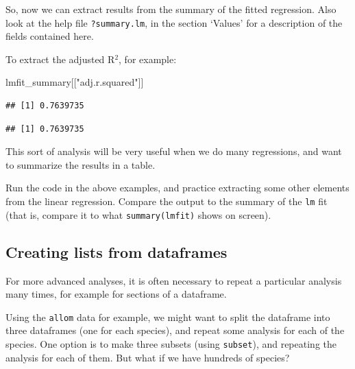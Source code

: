 \documentclass[]{book}
\newenvironment{Shaded}{\begin{snugshade}}{\end{snugshade}}
\newcommand{\CommentTok}[1]{\textcolor[rgb]{0.56,0.35,0.01}{\textit{#1}}}
\newcommand{\NormalTok}[1]{#1}
\newcommand{\OperatorTok}[1]{\textcolor[rgb]{0.81,0.36,0.00}{\textbf{#1}}}
\newcommand{\StringTok}[1]{\textcolor[rgb]{0.31,0.60,0.02}{#1}}
\let\BeginKnitrBlock\begin \let\EndKnitrBlock\end
\begin{document}
So, now we can extract results from the summary of the fitted regression. Also look at the help file \texttt{?summary.lm}, in the section `Values' for a description of the fields contained here.

To extract the adjusted R\(^2\), for example:

\begin{Shaded}
\begin{Highlighting}[]
\NormalTok{lmfit_summary[[}\StringTok{"adj.r.squared"}\NormalTok{]]}
\end{Highlighting}
\end{Shaded}

\begin{verbatim}
## [1] 0.7639735
\end{verbatim}

\begin{Shaded}
\end{Shaded}

\begin{verbatim}
## [1] 0.7639735
\end{verbatim}

This sort of analysis will be very useful when we do many regressions, and want to summarize the results in a table.

\BeginKnitrBlock{rmdtry}
Run the code in the above examples, and practice extracting some other elements from the linear regression. Compare the output to the summary of the \texttt{lm} fit (that is, compare it to what \texttt{summary(lmfit)} shows on screen).
\EndKnitrBlock{rmdtry}

\hypertarget{dfrlists}{%
\subsection{Creating lists from dataframes}\label{dfrlists}}

For more advanced analyses, it is often necessary to repeat a particular analysis many times, for example for sections of a dataframe.

Using the \texttt{allom} data for example, we might want to split the dataframe into three dataframes (one for each species), and repeat some analysis for each of the species. One option is to make three subsets (using \texttt{subset}), and repeating the analysis for each of them. But what if we have hundreds of species?
\end{document}
